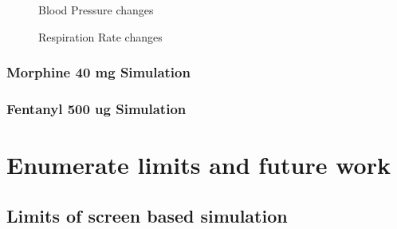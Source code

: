 \documentclass[a4paper]{article}
\begin{document}
\begin{figure}[!htb]\centering
   \begin{minipage}{0.49\textwidth}
     \caption{Blood Pressure changes}
     \label{fig:given 200 mg Propofol}
     
   \end{minipage}
   \begin {minipage}{0.49\textwidth}
     \caption{Respiration Rate changes}
     \label{fig:given 200 mg Propofol}
   \end{minipage}
\end{figure}

\subsubsection{Morphine 40 mg Simulation}

\subsubsection{Fentanyl 500 ug Simulation}


\section{Enumerate limits and future work}
\subsection{Limits of screen based simulation}
\end{document}
